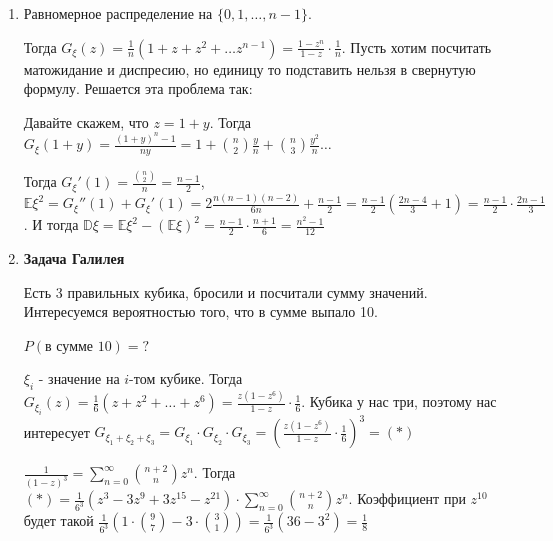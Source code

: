 \begin{example}
    \begin{enumerate}
        \item {
            Равномерное распределение на $\{ 0, 1, \ldots, n - 1 \}$.

            Тогда $G_{\xi}(z) = \frac{1}{n}(1 + z + z^2 + \ldots z^{n - 1}) = \frac{1 - z^n}{1 - z} \cdot \frac{1}{n}$. Пусть хотим
            посчитать матожидание и диспресию, но единицу то подставить нельзя в свернутую формулу. Решается эта проблема так:

            Давайте скажем, что $z = 1 + y$. Тогда $G_{\xi}(1 + y) = \frac{(1 + y)^n - 1}{ny} = 1 + \binom{n}{2} \frac{y}{n} + \binom{n}{3} \frac{y^2}{n} \ldots$

            Тогда $G_{\xi}'(1) = \frac{\binom{n}{2}}{n} = \frac{n - 1}{2}$, $\mathbb{E} \xi^2 = G_{\xi}''(1) + G_{\xi}'(1) = 2\frac{n(n-1)(n-2)}{6n} + \frac{n - 1}{2} =
            \frac{n - 1}{2}(\frac{2n - 4}{3} + 1) = \frac{n - 1}{2} \cdot \frac{2n - 1}{3}$. И тогда $\mathbb{D} \xi = \mathbb{E}\xi^2 - (\mathbb{E}\xi)^2 =
            \frac{n - 1}{2} \cdot \frac{n + 1}{6} = \frac{n^2 - 1}{12}$
        }
        \item {
            \textbf{Задача Галилея}

            Есть 3 правильных кубика, бросили и посчитали сумму значений. Интересуемся вероятностью того, что
            в сумме выпало 10.

            $P(\text{в сумме 10}) = ?$

            $\xi_i$ - значение на $i$-том кубике. Тогда $G_{\xi_i}(z) = \frac{1}{6}(z + z^2 + \ldots + z^6) = \frac{z(1 - z^6)}{1 - z} \cdot \frac{1}{6}$.
            Кубика у нас три, поэтому нас интересует $G_{\xi_1 + \xi_2 + \xi_3} = G_{\xi_1} \cdot G_{\xi_2} \cdot G_{\xi_3} = \left ( \frac{z(1 - z^6)}{1 - z} \cdot \frac{1}{6} \right )^3 = (*)$

            $\frac{1}{(1 - z)^3} = \sum_{n = 0}^{\infty} \binom{n+2}{n} z^n$. Тогда $(*) = \frac{1}{6^3} (z^3 - 3z^9 + 3z^15 - z^21) \cdot \sum_{n = 0}^{\infty} \binom{n+2}{n} z^n$. Коэффициент при $z^{10}$ будет такой
            $\frac{1}{6^3} (1 \cdot \binom{9}{7} - 3 \cdot \binom{3}{1}) = \frac{1}{6^3} (36 - 3^2) = \frac{1}{8}$
        }
    \end{enumerate}
\end{example}